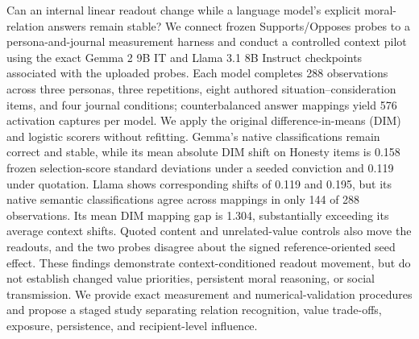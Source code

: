 Can an internal linear readout change while a language model's explicit moral-relation answers remain stable? We connect frozen Supports/Opposes probes to a persona-and-journal measurement harness and conduct a controlled context pilot using the exact Gemma 2 9B IT and Llama 3.1 8B Instruct checkpoints associated with the uploaded probes. Each model completes 288 observations across three personas, three repetitions, eight authored situation--consideration items, and four journal conditions; counterbalanced answer mappings yield 576 activation captures per model. We apply the original difference-in-means (DIM) and logistic scorers without refitting. Gemma's native classifications remain correct and stable, while its mean absolute DIM shift on Honesty items is 0.158 frozen selection-score standard deviations under a seeded conviction and 0.119 under quotation. Llama shows corresponding shifts of 0.119 and 0.195, but its native semantic classifications agree across mappings in only 144 of 288 observations. Its mean DIM mapping gap is 1.304, substantially exceeding its average context shifts. Quoted content and unrelated-value controls also move the readouts, and the two probes disagree about the signed reference-oriented seed effect. These findings demonstrate context-conditioned readout movement, but do not establish changed value priorities, persistent moral reasoning, or social transmission. We provide exact measurement and numerical-validation procedures and propose a staged study separating relation recognition, value trade-offs, exposure, persistence, and recipient-level influence.
